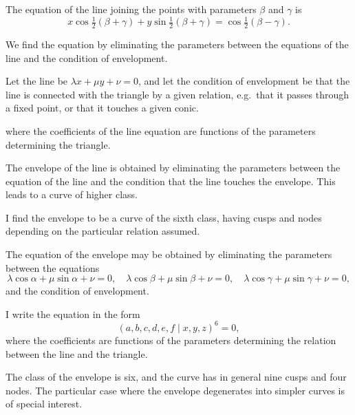 \documentclass[11pt,a4paper]{article}
\theoremstyle{plain}
\begin{document}
The equation of the line joining the points with parameters $\beta$ and $\gamma$ is
\begin{equation}
x\cos\tfrac{1}{2}(\beta+\gamma) + y\sin\tfrac{1}{2}(\beta+\gamma) = \cos\tfrac{1}{2}(\beta-\gamma).
\end{equation}

\newpage
\setcounter{equation}{1}

We find the equation by eliminating the parameters between the equations of the line and the condition of envelopment.

Let the line be $\lambda x + \mu y + \nu = 0$, and let the condition of envelopment be that the line is connected with the triangle by a given relation, e.g.~that it passes through a fixed point, or that it touches a given conic.

\newpage
\setcounter{equation}{1}

where the coefficients of the line equation are functions of the parameters determining the triangle.

The envelope of the line is obtained by eliminating the parameters between the equation of the line and the condition that the line touches the envelope. This leads to a curve of higher class.

\newpage
\setcounter{equation}{1}

I find the envelope to be a curve of the sixth class, having cusps and nodes depending on the particular relation assumed.

The equation of the envelope may be obtained by eliminating the parameters between the equations
\begin{equation}
\lambda\cos\alpha + \mu\sin\alpha + \nu = 0, \quad \lambda\cos\beta + \mu\sin\beta + \nu = 0, \quad \lambda\cos\gamma + \mu\sin\gamma + \nu = 0,
\end{equation}
and the condition of envelopment.

\newpage
\setcounter{equation}{2}

I write the equation in the form
\begin{equation}
(a, b, c, d, e, f \mid x, y, z)^6 = 0,
\end{equation}
where the coefficients are functions of the parameters determining the relation between the line and the triangle.

The class of the envelope is six, and the curve has in general nine cusps and four nodes. The particular case where the envelope degenerates into simpler curves is of special interest.
\end{document}
